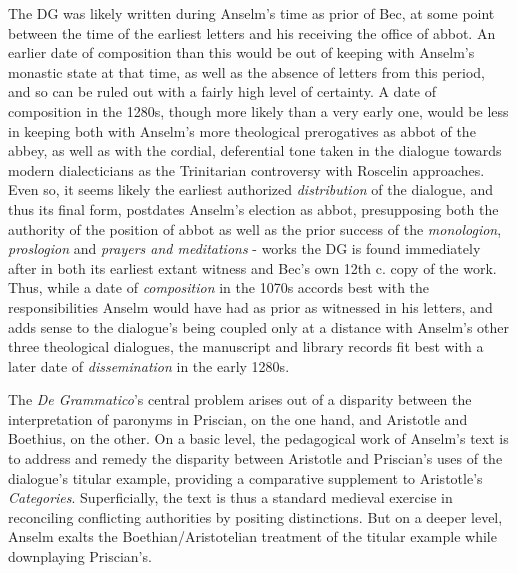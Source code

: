 \documentclass[]{article}
\begin{document}
The DG was likely written during Anselm's time as prior of Bec, at some point between the time of the earliest letters and his receiving the office of abbot. An earlier date of composition than this would be out of keeping with Anselm's monastic state at that time, as well as the absence of letters from this period, and so can be ruled out with a fairly high level of certainty. A date of composition in the 1280s, though more likely than a very early one, would be less in keeping both with Anselm's more theological prerogatives as abbot of the abbey, as well as with the cordial, deferential tone taken in the dialogue towards modern dialecticians as the Trinitarian controversy with Roscelin approaches. Even so, it seems likely the earliest authorized \textit{distribution} of the dialogue, and thus its final form, postdates Anselm's election as abbot, presupposing both the authority of the position of abbot as well as the prior success of the \textit{monologion}, \textit{proslogion} and \textit{prayers and meditations} - works the DG is found immediately after in both its earliest extant witness and Bec's own 12th c. copy of the work. Thus, while a date of \textit{composition} in the 1070s accords best with the responsibilities Anselm would have had as prior as witnessed in his letters, and adds sense to the dialogue's being coupled only at a distance with Anselm's other three theological dialogues, the manuscript and library records fit best with a later date of \textit{dissemination} in the early 1280s.

The \textit{De Grammatico}'s central problem arises out of a disparity between the interpretation of paronyms in Priscian, on the one hand, and Aristotle and Boethius, on the other. On a basic level, the pedagogical work of Anselm's text is to address and remedy the disparity between Aristotle and Priscian's uses of the dialogue's titular example, providing a comparative supplement to Aristotle's \textit{Categories}. Superficially, the text is thus a standard medieval exercise in reconciling conflicting authorities by positing distinctions. But on a deeper level, Anselm exalts the Boethian/Aristotelian treatment of the titular example while downplaying Priscian's.
\end{document}
